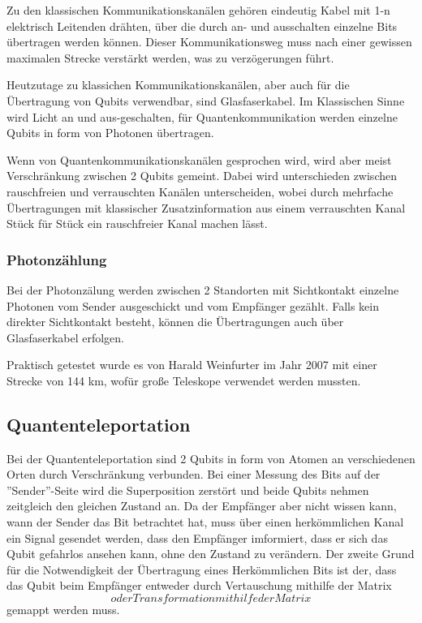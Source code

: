 Zu den klassischen Kommunikationskanälen gehören eindeutig Kabel mit 1-n elektrisch Leitenden drähten, über die durch an- und ausschalten einzelne Bits übertragen werden können. Dieser Kommunikationsweg muss nach einer gewissen maximalen Strecke verstärkt werden, was zu verzögerungen führt.

Heutzutage zu klassichen Kommunikationskanälen, aber auch für die Übertragung von Qubits verwendbar, sind Glasfaserkabel. Im Klassischen Sinne wird Licht an und aus-geschalten, für Quantenkommunikation werden einzelne Qubits in form von Photonen übertragen.

Wenn von Quantenkommunikationskanälen gesprochen wird, wird aber meist Verschränkung zwischen 2 Qubits gemeint. Dabei wird unterschieden zwischen rauschfreien und verrauschten Kanälen unterscheiden, wobei durch mehrfache Übertragungen mit klassischer Zusatzinformation aus einem verrauschten Kanal Stück für Stück ein rauschfreier Kanal machen lässt.


\subsubsection{Photonzählung}
\label{sec:Photonzaelung}

Bei der Photonzälung werden zwischen 2 Standorten mit Sichtkontakt einzelne Photonen vom Sender ausgeschickt und vom Empfänger gezählt. Falls kein direkter Sichtkontakt besteht, können die Übertragungen auch über Glasfaserkabel erfolgen.

Praktisch getestet wurde es von Harald Weinfurter im Jahr 2007 mit einer Strecke von 144 km, wofür große Teleskope verwendet werden mussten.


\subsection{Quantenteleportation}
\label{sec:Quantenteleportation}

Bei der Quantenteleportation sind 2 Qubits in form von Atomen an verschiedenen Orten durch Verschränkung verbunden. Bei einer Messung des Bits auf der ''Sender''-Seite wird die Superposition zerstört und beide Qubits nehmen zeitgleich den gleichen Zustand an. Da der Empfänger aber nicht wissen kann, wann der Sender das Bit betrachtet hat, muss über einen herkömmlichen Kanal ein Signal gesendet werden, dass den Empfänger imformiert, dass er sich das Qubit gefahrlos ansehen kann, ohne den Zustand zu verändern. Der zweite Grund für die Notwendigkeit der Übertragung eines Herkömmlichen Bits ist der, dass das Qubit beim Empfänger entweder durch Vertauschung mithilfe der Matrix $$ oder Transformation mithilfe der Matrix $$ gemappt werden muss.


